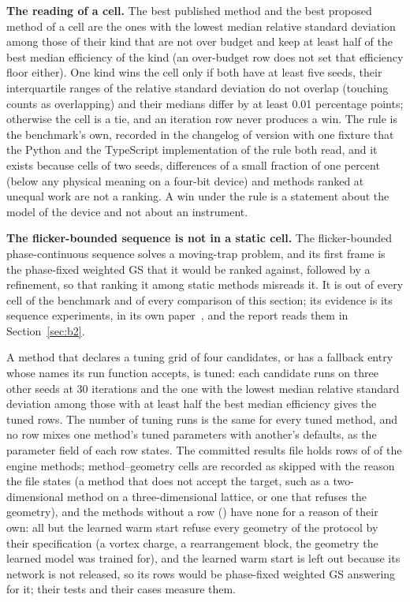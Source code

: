 \textbf{The reading of a cell.} The best published method and the best proposed method of a cell are the ones with the lowest median relative standard deviation among those of their kind that are not over budget and keep at least half of the best median efficiency of the kind (an over-budget row does not set that efficiency floor either). One kind wins the cell only if both have at least five seeds, their interquartile ranges of the relative standard deviation do not overlap (touching counts as overlapping) and their medians differ by at least 0.01 percentage points; otherwise the cell is a tie, and an iteration row never produces a win. The rule is the benchmark's own, recorded in the changelog of version \productVersion{} with one fixture that the Python and the TypeScript implementation of the rule both read, and it exists because cells of two seeds, differences of a small fraction of one percent (below any physical meaning on a four-bit device) and methods ranked at unequal work are not a ranking. A win under the rule is a statement about the model of the device and not about an instrument.

\textbf{The flicker-bounded sequence is not in a static cell.} The flicker-bounded phase-continuous sequence solves a moving-trap problem, and its first frame is the phase-fixed weighted GS that it would be ranked against, followed by a refinement, so that ranking it among static methods misreads it. It is out of every cell of the benchmark and of every comparison of this section; its evidence is its sequence experiments, in its own paper~\cite{flickerpaper}, and the report reads them in Section~\ref{sec:b2}.

A method that declares a tuning grid of four candidates, or has a fallback entry whose names its run function accepts, is tuned: each candidate runs on three other seeds at 30 iterations and the one with the lowest median relative standard deviation among those with at least half the best median efficiency gives the tuned rows. The number of tuning runs is the same for every tuned method, and no row mixes one method's tuned parameters with another's defaults, as the parameter field of each row states. The committed results file holds \benchRows{} rows of \benchNMeasured{} of the \benchNProtocol{} engine methods; \benchSkipped{} method--geometry cells are recorded as skipped with the reason the file states (a method that does not accept the target, such as a two-dimensional method on a three-dimensional lattice, or one that refuses the geometry), and the \benchNNoRows{} methods without a row (\benchNoRows) have none for a reason of their own: all but the learned warm start refuse every geometry of the protocol by their specification (a vortex charge, a rearrangement block, the geometry the learned model was trained for), and the learned warm start is left out because its network is not released, so its rows would be phase-fixed weighted GS answering for it; their tests and their cases measure them.

